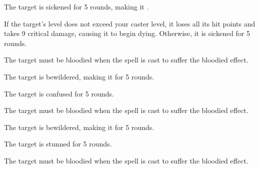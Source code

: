 \spellrng{\rngclose}
\begin{spellhealthy}
  The target is sickened for 5 rounds, making it \vulnerable.
\end{spellhealthy}
\begin{spellblood}
  If the target's level does not exceed your caster level, it loses all its hit points and takes 9 critical damage, causing it to begin dying. Otherwise, it is sickened for 5 rounds.
\end{spellblood}
\begin{spellnotes}
  The target must be bloodied when the spell is cast to suffer the bloodied effect.
\end{spellnotes}

\spellrng{\rngclose}
\begin{spellhealthy}
  The target is bewildered, making it \vulnerable for 5 rounds.
\end{spellhealthy}
\begin{spellblood}
  The target is confused for 5 rounds. \confusionexplanation
\end{spellblood}
\begin{spellnotes}
  The target must be bloodied when the spell is cast to suffer the bloodied effect.
\end{spellnotes}

\spellrng{\rngclose}
\begin{spellhealthy}
  The target is bewildered, making it \vulnerable for 5 rounds.
\end{spellhealthy}
\begin{spellblood}
  The target is stunned for 5 rounds.
\end{spellblood}
\begin{spellnotes}
  The target must be bloodied when the spell is cast to suffer the bloodied effect.
\end{spellnotes}

